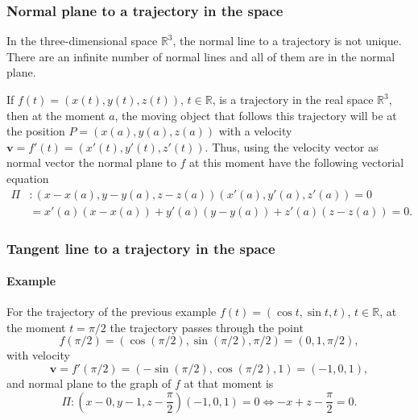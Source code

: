\begin{frame}
\frametitle{Normal plane to a trajectory in the space}
In the three-dimensional space $\mathbb{R}^3$, the normal line to a trajectory is not unique.
There are an infinite number of normal lines and all of them are in the normal plane.

If $f(t)=(x(t),y(t),z(t))$, $t\in \mathbb{R}$, is a trajectory in the real space $\mathbb{R}^3$, then at the moment $a$, the moving object that follows this trajectory will be at the position $P=(x(a),y(a),z(a))$ with a velocity $\mathbf{v}=f'(t)=(x'(t),y'(t),z'(t))$.
Thus, using the velocity vector as normal vector the normal plane to $f$ at this moment have the following vectorial equation
\begin{align*}
\Pi &: (x-x(a),y-y(a),z-z(a))(x'(a),y'(a),z'(a)) = 0\\
&= x'(a)(x-x(a))+y'(a)(y-y(a))+z'(a)(z-z(a))=0.
\end{align*}
\end{frame}


\begin{frame}
\frametitle{Tangent line to a trajectory in the space}
\framesubtitle{Example}
For the trajectory of the previous example $f(t)=(\cos t, \sin t, t)$, $t\in \mathbb{R}$, at the moment $t=\pi/2$ the trajectory passes through the point
\[
f(\pi/2)=(\cos(\pi/2),\sin(\pi/2),\pi/2)=(0,1,\pi/2),
\]
with velocity
\[
\mathbf{v}=f'(\pi/2)=(-\sin(\pi/2),\cos(\pi/2), 1)=(-1,0,1),
\]
and normal plane to the graph of $f$ at that moment is
\[
\Pi:\left(x-0,y-1,z-\frac{\pi}{2}\right)(-1,0,1) =0 \Leftrightarrow -x+z-\frac{\pi}{2}=0.
\]
\begin{center}

\end{center}
\end{frame}


